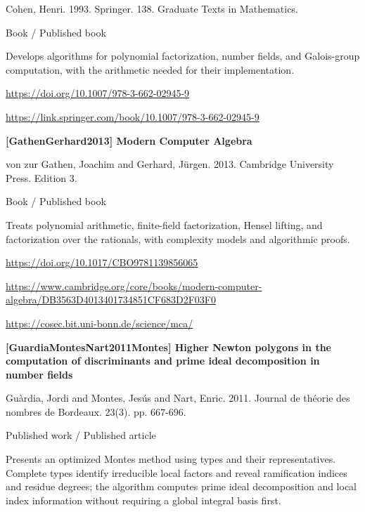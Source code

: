 \documentclass[11pt,a4paper,oneside,openany]{book}
\begin{document}
\color{black} Cohen, Henri. 1993. Springer. 138. Graduate Texts in Mathematics.\par
{\small\sffamily\color{atlasgold}Book / Published book}\par
\color{black} Develops algorithms for polynomial factorization, number fields, and Galois-group computation, with the arithmetic needed for their implementation.\par
{\footnotesize\url{https://doi.org/10.1007/978-3-662-02945-9}}\par
{\footnotesize\url{https://link.springer.com/book/10.1007/978-3-662-02945-9}}\par
\vspace{9pt}
\hypertarget{ref:GathenGerhard2013}{}
{\sffamily\bfseries\color{atlasgreen}[GathenGerhard2013] Modern Computer Algebra}\par
\color{black} von zur Gathen, Joachim and Gerhard, Jürgen. 2013. Cambridge University Press. Edition 3.\par
{\small\sffamily\color{atlasgold}Book / Published book}\par
\color{black} Treats polynomial arithmetic, finite-field factorization, Hensel lifting, and factorization over the rationals, with complexity models and algorithmic proofs.\par
{\footnotesize\url{https://doi.org/10.1017/CBO9781139856065}}\par
{\footnotesize\url{https://www.cambridge.org/core/books/modern-computer-algebra/DB3563D4013401734851CF683D2F03F0}}\par
{\footnotesize\url{https://cosec.bit.uni-bonn.de/science/mca/}}\par
\vspace{9pt}
\hypertarget{ref:GuardiaMontesNart2011Montes}{}
{\sffamily\bfseries\color{atlasgreen}[GuardiaMontesNart2011Montes] Higher Newton polygons in the computation of discriminants and prime ideal decomposition in number fields}\par
\color{black} Guàrdia, Jordi and Montes, Jesús and Nart, Enric. 2011. Journal de théorie des nombres de Bordeaux. 23(3). pp. 667-696.\par
{\small\sffamily\color{atlasgold}Published work / Published article}\par
\color{black} Presents an optimized Montes method using types and their representatives. Complete types identify irreducible local factors and reveal ramification indices and residue degrees; the algorithm computes prime ideal decomposition and local index information without requiring a global integral basis first.\par
\end{document}
